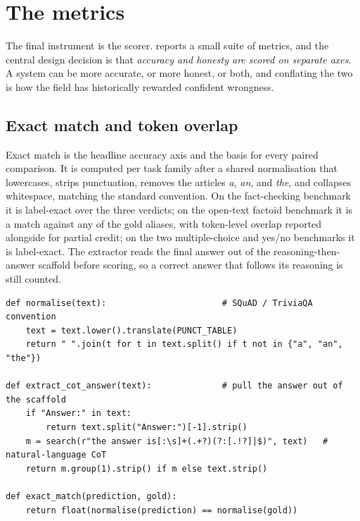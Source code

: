 \section{The metrics}
\label{sec:bench-metrics}

The final instrument is the scorer. \caem{} reports a small suite of metrics, and the
central design decision is that \emph{accuracy and honesty are scored on separate
axes}. A system can be more accurate, or more honest, or both, and conflating the two
is how the field has historically rewarded confident wrongness.

\subsection*{Exact match and token overlap}

\begin{precise}
Exact match is the headline accuracy axis and the basis for every paired comparison.
It is computed per task family after a shared normalisation that lowercases, strips
punctuation, removes the articles \emph{a}, \emph{an}, and \emph{the}, and collapses
whitespace, matching the standard convention. On the fact-checking benchmark it is
label-exact over the three verdicts; on the open-text factoid benchmark it is a match
against any of the gold aliases, with token-level overlap reported alongside for
partial credit; on the two multiple-choice and yes/no benchmarks it is label-exact.
The extractor reads the final answer out of the reasoning-then-answer scaffold before
scoring, so a correct answer that follows its reasoning is still counted.
\end{precise}

\begin{lstlisting}[caption={Exact match and answer extraction, condensed from \texttt{eval/metrics.py}.}, label={lst:em}]
def normalise(text):                       # SQuAD / TriviaQA convention
    text = text.lower().translate(PUNCT_TABLE)
    return " ".join(t for t in text.split() if t not in {"a", "an", "the"})

def extract_cot_answer(text):              # pull the answer out of the scaffold
    if "Answer:" in text:
        return text.split("Answer:")[-1].strip()
    m = search(r"the answer is[:\s]+(.+?)(?:[.!?]|$)", text)   # natural-language CoT
    return m.group(1).strip() if m else text.strip()

def exact_match(prediction, gold):
    return float(normalise(prediction) == normalise(gold))
\end{lstlisting}

